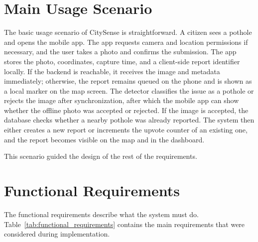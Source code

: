 \section{Main Usage Scenario}

The basic usage scenario of CitySense is straightforward. A citizen sees a pothole and opens the mobile app. The app requests camera and location permissions if necessary, and the user takes a photo and confirms the submission. The app stores the photo, coordinates, capture time, and a client-side report identifier locally. If the backend is reachable, it receives the image and metadata immediately; otherwise, the report remains queued on the phone and is shown as a local marker on the map screen. The detector classifies the issue as a pothole or rejects the image after synchronization, after which the mobile app can show whether the offline photo was accepted or rejected. If the image is accepted, the database checks whether a nearby pothole was already reported. The system then either creates a new report or increments the upvote counter of an existing one, and the report becomes visible on the map and in the dashboard.

This scenario guided the design of the rest of the requirements.

\section{Functional Requirements}

The functional requirements describe what the system must do. Table~\ref{tab:functional_requirements} contains the main requirements that were considered during implementation.

